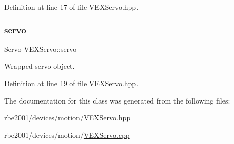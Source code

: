 Definition at line 17 of file V\+E\+X\+Servo.\+hpp.

\mbox{\label{class_v_e_x_servo_ab82f78aa9ea59ca24cec69e3e7563c3f}} 
\subsubsection{\texorpdfstring{servo}{servo}}
{\footnotesize\ttfamily Servo V\+E\+X\+Servo\+::servo\hspace{0.3cm}{\ttfamily [private]}}



Wrapped servo object. 



Definition at line 19 of file V\+E\+X\+Servo.\+hpp.



The documentation for this class was generated from the following files\+:\begin{DoxyCompactItemize}
\item 
rbe2001/devices/motion/\hyperlink{_v_e_x_servo_8hpp}{V\+E\+X\+Servo.\+hpp}\item 
rbe2001/devices/motion/\hyperlink{_v_e_x_servo_8cpp}{V\+E\+X\+Servo.\+cpp}\end{DoxyCompactItemize}
